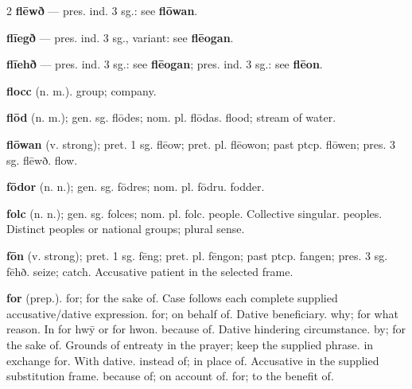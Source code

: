 \begin{multicols*}{2}
\textbf{flēwð} — pres. ind. 3 sg.: see \textbf{flōwan}.\par
\textbf{flīegð} — pres. ind. 3 sg., variant: see \textbf{flēogan}.\par
\textbf{flīehð} — pres. ind. 3 sg.: see \textbf{flēogan}; pres. ind. 3 sg.: see \textbf{flēon}.\par
\textbf{flocc} (n. m.). group; company.\par
\textbf{flōd} (n. m.); gen. sg. flōdes; nom. pl. flōdas. flood; stream of water.\par
\textbf{flōwan} (v. strong); pret. 1 sg. flēow; pret. pl. flēowon; past ptcp. flōwen; pres. 3 sg. flēwð. flow.\par
\textbf{fōdor} (n. n.); gen. sg. fōdres; nom. pl. fōdru. fodder.\par
\textbf{folc} (n. n.); gen. sg. folces; nom. pl. folc. people. Collective singular. peoples. Distinct peoples or national groups; plural sense.\par
\textbf{fōn} (v. strong); pret. 1 sg. fēng; pret. pl. fēngon; past ptcp. fangen; pres. 3 sg. fēhð. seize; catch. Accusative patient in the selected frame.\par
\textbf{for} (prep.). for; for the sake of. Case follows each complete supplied accusative/dative expression. for; on behalf of. Dative beneficiary. why; for what reason. In for hwȳ or for hwon. because of. Dative hindering circumstance. by; for the sake of. Grounds of entreaty in the prayer; keep the supplied phrase. in exchange for. With dative. instead of; in place of. Accusative in the supplied substitution frame. because of; on account of. for; to the benefit of.\par

\end{multicols*}
